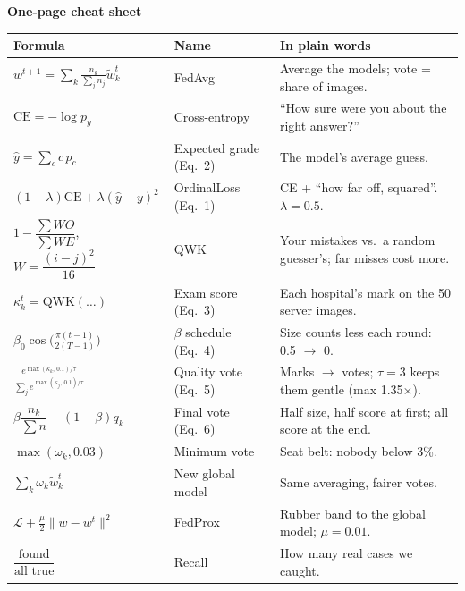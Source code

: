 \documentclass[11pt,a4paper]{article}
\begin{document}
\newpage
{\color{navy}\Large\bfseries One-page cheat sheet}\par\smallskip
\begin{center}\small
\renewcommand{\arraystretch}{1.6}
\begin{tabular}{@{}p{5.2cm}p{4.6cm}p{6.6cm}@{}}
\toprule
\textbf{Formula} & \textbf{Name} & \textbf{In plain words}\\ \midrule
$\displaystyle w^{t+1} = \sum_k \tfrac{n_k}{\sum_j n_j}\tilde{w}_k^t$ & FedAvg & Average the models; vote = share of images.\\
$\mathrm{CE} = -\log p_y$ & Cross-entropy & ``How sure were you about the right answer?''\\
$\hat{y} = \sum_c c\,p_c$ & Expected grade (Eq.~2) & The model's average guess.\\
$(1-\lambda)\mathrm{CE} + \lambda(\hat{y}-y)^2$ & OrdinalLoss (Eq.~1) & CE + ``how far off, squared''. $\lambda = 0.5$.\\
$1 - \dfrac{\sum W O}{\sum W E}$, $W = \dfrac{(i-j)^2}{16}$ & QWK & Your mistakes vs.\ a random guesser's; far misses cost more.\\
$\kappa_k^t = \mathrm{QWK}(\ldots)$ & Exam score (Eq.~3) & Each hospital's mark on the 50 server images.\\
$\beta_0\cos\!\big(\tfrac{\pi(t-1)}{2(T-1)}\big)$ & $\beta$ schedule (Eq.~4) & Size counts less each round: 0.5 $\rightarrow$ 0.\\
$\displaystyle\frac{e^{\max(\kappa_k,\,0.1)/\tau}}{\sum_j e^{\max(\kappa_j,\,0.1)/\tau}}$ & Quality vote (Eq.~5) & Marks $\rightarrow$ votes; $\tau = 3$ keeps them gentle (max 1.35$\times$).\\
$\beta\dfrac{n_k}{\sum n} + (1-\beta)q_k$ & Final vote (Eq.~6) & Half size, half score at first; all score at the end.\\
$\max(\omega_k, 0.03)$ & Minimum vote & Seat belt: nobody below 3\%.\\
$\sum_k \omega_k \tilde{w}_k^t$ & New global model & Same averaging, fairer votes.\\
$\mathcal{L} + \frac{\mu}{2}\lVert w - w^t\rVert^2$ & FedProx & Rubber band to the global model; $\mu = 0.01$.\\
$\dfrac{\text{found}}{\text{all true}}$ & Recall & How many real cases we caught.\\
\bottomrule
\end{tabular}
\end{center}

\medskip
{}
\end{document}
